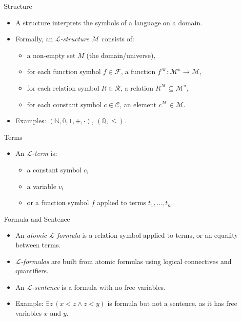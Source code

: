 \documentclass[aspectratio=169,11pt]{beamer}
\begin{document}
\begin{frame}{Structure}
  \begin{itemize}
    \item A structure interprets the symbols of a language on a domain.
    \item Formally, an \textit{$\mathcal{L}$-structure} $\mathcal{M}$ consists of:
      \begin{itemize}
        \item a non-empty set \(M\) (the domain/universe),
        \item for each function symbol \(f \in \mathcal{F}\), a function \(f^{\mathcal{M}} : \mathcal{M}^n \to \mathcal{M}\),
        \item for each relation symbol \(R \in \mathcal{R}\), a relation \(R^{\mathcal{M}} \subseteq \mathcal{M}^n\),
        \item for each constant symbol \(c \in \mathcal{C}\), an element \(c^{\mathcal{M}} \in \mathcal{M}\).
      \end{itemize}
    \item Examples: \((\mathbb{N}, 0, 1, +, \cdot)\), {\((\mathbb{Q}, \leq)\)}.
  \end{itemize}
\end{frame}

\begin{frame}{Terms}
  \begin{itemize}
    \item An \textit{$\mathcal{L}$-term} is:
    \begin{itemize}
      \item a constant symbol \(c\),
      \item a variable \(v_i\)
      \item or a function symbol \(f\) applied to terms \(t_1, \ldots, t_n\).
    \end{itemize}
  \end{itemize}
\end{frame}

\begin{frame}{Formula and Sentence}
  \begin{itemize}
    \item An \textit{atomic $\mathcal{L}$-formula} is a relation symbol applied to terms, or an equality between terms.
    \item \textit{$\mathcal{L}$-formulas} are built from atomic formulas using logical connectives and quantifiers.
    \item An \textit{$\mathcal{L}$-sentence} is a formula with no free variables.
    \item Example: \(\exists z\,(x < z \wedge z < y)\) is formula but not a sentence, as it has free variables \(x\) and \(y\).
  \end{itemize}
\end{frame}
\end{document}
